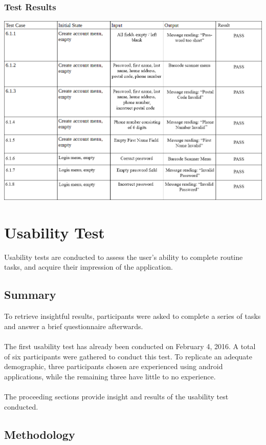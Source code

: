\documentclass[12pt, titlepage]{article}
\begin{document}
\subsubsection{Test Results}
\includegraphics[width=1.2\textwidth]{accountTC.png}
\section{Usability Test}
Usability tests are conducted to assess the user's ability to complete routine tasks, and acquire their impression of the application.
\subsection{Summary}

To retrieve insightful results, participants were asked to complete a series of tasks and answer a brief questionnaire afterwards. 
\\\\
The first usability test has already been conducted on February 4, 2016. A total of six participants were gathered to conduct this test. To replicate an adequate demographic, three participants chosen are experienced using android applications, while the remaining three have little to no experience. 
\\\\
The proceeding sections provide insight and results of the usability test conducted. 

\subsection{Methodology}
\end{document}
